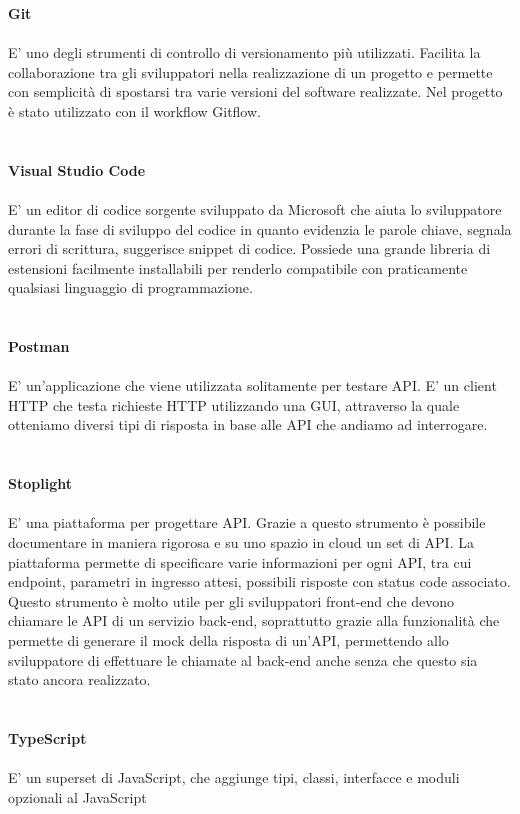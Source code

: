 \textbf{Git}
\\\\
E' uno degli strumenti di controllo di versionamento più utilizzati. Facilita la collaborazione
tra gli sviluppatori nella realizzazione di un progetto e permette con semplicità di spostarsi
tra varie versioni del software realizzate. Nel progetto è stato utilizzato con il workflow
Gitflow.
\\\\\\
\textbf{Visual Studio Code}
\\\\
E' un editor di codice sorgente sviluppato da Microsoft che aiuta lo sviluppatore durante la fase
di sviluppo del codice in quanto evidenzia le parole chiave, segnala errori di scrittura, suggerisce
snippet di codice. Possiede una grande libreria di estensioni facilmente installabili per renderlo
compatibile con praticamente qualsiasi linguaggio di programmazione.
\\\\\\
\textbf{Postman}
\\\\
E' un'applicazione che viene utilizzata solitamente per testare API. E' un client HTTP che testa richieste
HTTP utilizzando una GUI, attraverso la quale otteniamo diversi tipi di risposta in base alle API che 
andiamo ad interrogare.
\\\\\\
\textbf{Stoplight}
\\\\
E' una piattaforma per progettare API. Grazie a questo strumento è possibile documentare in maniera rigorosa
e su uno spazio in cloud un set di API. La piattaforma permette di specificare varie informazioni per ogni
API, tra cui endpoint, parametri in ingresso attesi, possibili risposte con status code associato. Questo
strumento è molto utile per gli sviluppatori front-end che devono chiamare le API di un servizio
back-end, soprattutto grazie alla funzionalità che permette di generare il mock della risposta di un'API, 
permettendo allo sviluppatore di effettuare le chiamate al back-end anche senza che questo sia stato ancora realizzato.
\\\\\\
\textbf{TypeScript}
\\\\
E' un superset di JavaScript, che aggiunge tipi, classi, interfacce e moduli opzionali al JavaScript 
